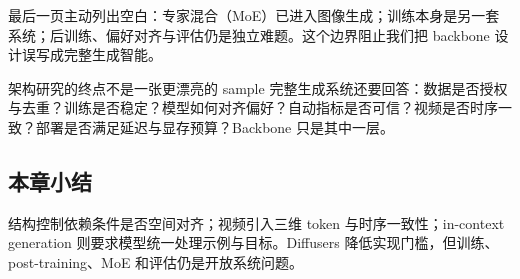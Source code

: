 最后一页主动列出空白：专家混合（MoE）已进入图像生成；训练本身是另一套系统；后训练、偏好对齐与评估仍是独立难题。这个边界阻止我们把 backbone 设计误写成完整生成智能。


\begin{importantbox}{架构研究的终点不是一张更漂亮的 sample}
完整生成系统还要回答：数据是否授权与去重？训练是否稳定？模型如何对齐偏好？自动指标是否可信？视频是否时序一致？部署是否满足延迟与显存预算？Backbone 只是其中一层。
\end{importantbox}

\subsection{本章小结}

结构控制依赖条件是否空间对齐；视频引入三维 token 与时序一致性；in-context generation 则要求模型统一处理示例与目标。Diffusers 降低实现门槛，但训练、post-training、MoE 和评估仍是开放系统问题。

